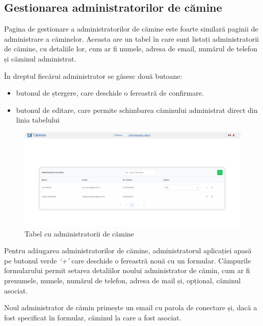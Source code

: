 \documentclass[12pt,a4paper]{report}
\theoremstyle{definition}
\theoremstyle{remark}
\begin{document}
\subsection{Gestionarea administratorilor de cămine}

\par Pagina de gestionare a administratorilor de cămine este foarte similară paginii de administrare a căminelor. Aceasta are un tabel în care sunt listați administratorii de cămine, cu detaliile lor, cum ar fi numele, adresa de email, numărul de telefon și căminul administrat.

\par În dreptul fiecărui administrator se găsesc două butoane:

\begin{itemize}
    \item butonul de ștergere, care deschide o fereastră de confirmare.
    \item butonul de editare, care permite schimbarea căminului administrat direct din linia tabelului
\end{itemize}

\begin{figure}[H]
    \centering
    \includegraphics[width=0.8\linewidth]{resurse/ghid_utilizare/editare_administrator_camin.png}
    \caption{Tabel cu administratorii de cămine}
\end{figure}

\par Pentru adăugarea administratorilor de cămine, administratorul aplicației apasă pe butonul verde \textit{`+'} care deschide o fereastră nouă cu un formular. Câmpurile formularului permit setarea detaliilor noului administrator de cămin, cum ar fi prenumele, numele, numărul de telefon, adresa de mail și, opțional, căminul asociat.

\par Noul administrator de cămin primește un email cu parola de conectare și, dacă a fost specificat în formular, căminul la care a fost asociat.
\end{document}
